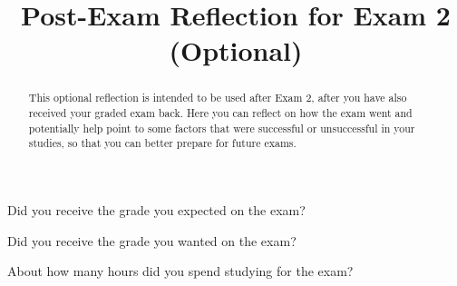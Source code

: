 \documentclass{ximera}
\title{Post-Exam Reflection for Exam 2 (Optional)}
\begin{document}
\begin{abstract}
This optional reflection is intended to be used after Exam 2, after you have also received your graded exam back. Here you can reflect on how the exam went and potentially help point to some factors that were successful or unsuccessful in your studies, so that you can better prepare for future exams.
\end{abstract}
\maketitle


\begin{question}
    Did you receive the grade you expected on the exam?

  \begin{multipleChoice}
  \end{multipleChoice}
\end{question}

\begin{question}
    Did you receive the grade you wanted on the exam?

  \begin{multipleChoice}
  \end{multipleChoice}
\end{question}

\begin{question}
  About how many hours did you spend studying for the exam?
  \begin{multipleChoice}
  \end{multipleChoice}
\end{question}
\end{document}
